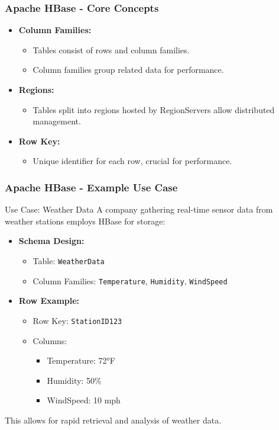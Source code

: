 \documentclass[aspectratio=169]{beamer}
\begin{document}
\begin{frame}[fragile]
    \frametitle{Apache HBase - Core Concepts}
    \begin{itemize}
        \item \textbf{Column Families:}
        \begin{itemize}
            \item Tables consist of rows and column families.
            \item Column families group related data for performance.
        \end{itemize}
        
        \item \textbf{Regions:}
        \begin{itemize}
            \item Tables split into regions hosted by RegionServers allow distributed management.
        \end{itemize}
        
        \item \textbf{Row Key:}
        \begin{itemize}
            \item Unique identifier for each row, crucial for performance.
        \end{itemize}
    \end{itemize}
\end{frame}

\begin{frame}[fragile]
    \frametitle{Apache HBase - Example Use Case}
    \begin{block}{Use Case: Weather Data}
        A company gathering real-time sensor data from weather stations employs HBase for storage:
        \begin{itemize}
            \item \textbf{Schema Design:}
            \begin{itemize}
                \item Table: \texttt{WeatherData}
                \item Column Families: \texttt{Temperature}, \texttt{Humidity}, \texttt{WindSpeed}
            \end{itemize}
            
            \item \textbf{Row Example:}
            \begin{itemize}
                \item Row Key: \texttt{StationID123}
                \item Columns:
                \begin{itemize}
                    \item Temperature: 72°F
                    \item Humidity: 50\%
                    \item WindSpeed: 10 mph
                \end{itemize}
            \end{itemize}
        \end{itemize}
        This allows for rapid retrieval and analysis of weather data.
    \end{block}
\end{frame}
\end{document}
